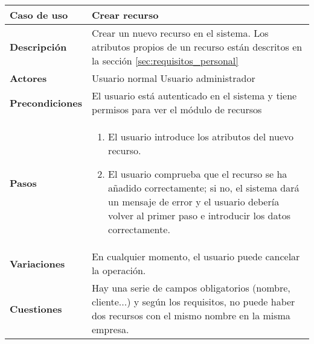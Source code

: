 \begin{tabular}{|p{1.25in}|p{3.65in}|}\hline
\textbf{Caso de uso} & \textbf{Crear recurso}\\\hline\hline
\textbf{Descripción} & Crear un nuevo recurso en el sistema. Los
atributos propios de un recurso están descritos en la sección
\ref{sec:requisitos_personal}\\\hline
\textbf{Actores} & Usuario normal \newline Usuario administrador\\\hline
\textbf{Precondiciones} & El usuario está autenticado en el sistema y
tiene permisos para ver el módulo de recursos\\\hline
\textbf{Pasos} &
  \begin{enumerate}
   \item El usuario introduce los atributos del nuevo recurso.
   \item El usuario comprueba que el recurso se ha añadido correctamente; si
no, el sistema dará un mensaje de error y el usuario debería volver al primer
paso e introducir los datos correctamente.
  \end{enumerate}
\\\hline
\textbf{Variaciones} & En cualquier momento, el usuario puede cancelar
la operación.\\\hline
\textbf{Cuestiones} & Hay una serie de campos obligatorios (nombre,
cliente...) y según los requisitos, no puede haber dos recursos
con el mismo nombre en la misma empresa.\\\hline
\end{tabular}

